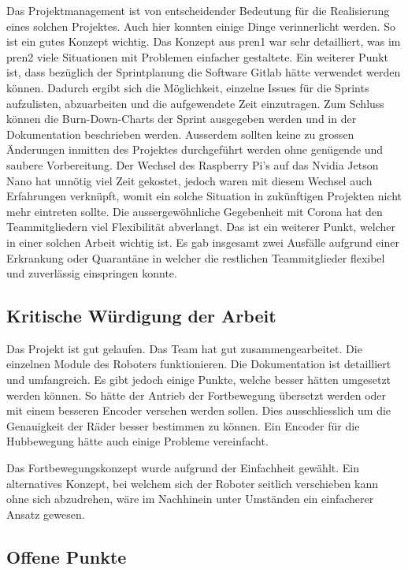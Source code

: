 Das Projektmanagement ist von entscheidender Bedeutung für die Realisierung eines solchen Projektes. Auch hier konnten einige Dinge verinnerlicht werden. So ist ein gutes Konzept wichtig. Das Konzept aus \acrshort{pren1} war sehr detailliert, was im \acrshort{pren2} viele Situationen mit Problemen einfacher gestaltete. Ein weiterer Punkt ist, dass bezüglich der Sprintplanung die Software Gitlab hätte verwendet werden können. Dadurch ergibt sich die Möglichkeit, einzelne Issues für die Sprints aufzulisten, abzuarbeiten und die aufgewendete Zeit einzutragen. Zum Schluss können die Burn-Down-Charts der Sprint ausgegeben werden und in der Dokumentation beschrieben werden. Ausserdem sollten keine zu grossen Änderungen inmitten des Projektes durchgeführt werden ohne genügende und saubere Vorbereitung. Der Wechsel des Raspberry Pi's auf das Nvidia Jetson Nano hat unnötig viel Zeit gekostet, jedoch waren mit diesem Wechsel auch Erfahrungen verknüpft, womit ein solche Situation in zukünftigen Projekten nicht mehr eintreten sollte.
Die aussergewöhnliche Gegebenheit mit Corona hat den Teammitgliedern viel Flexibilität abverlangt. Das ist ein weiterer Punkt, welcher in einer solchen Arbeit wichtig ist. Es gab insgesamt zwei Ausfälle aufgrund einer Erkrankung oder Quarantäne in welcher die restlichen Teammitglieder flexibel und zuverlässig einspringen konnte.

\newpage

\subsection{Kritische Würdigung der Arbeit}

Das Projekt ist gut gelaufen. Das Team hat gut zusammengearbeitet. Die einzelnen Module des Roboters funktionieren. Die Dokumentation ist detailliert und umfangreich. Es gibt jedoch einige Punkte, welche besser hätten umgesetzt werden können. So hätte der Antrieb der Fortbewegung übersetzt werden oder mit einem besseren Encoder versehen werden sollen. Dies ausschliesslich um die Genauigkeit der Räder besser bestimmen zu können. Ein Encoder für die Hubbewegung hätte auch einige Probleme vereinfacht.

Das Fortbewegungskonzept wurde aufgrund der Einfachheit gewählt. Ein alternatives Konzept, bei welchem sich der Roboter seitlich verschieben kann ohne sich abzudrehen, wäre im Nachhinein unter Umständen ein einfacherer Ansatz gewesen.


\subsection{Offene Punkte}

